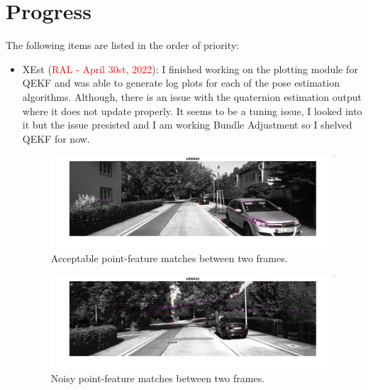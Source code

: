 \documentclass[11pt]{article}
\begin{document}
\section{Progress}
The following items are listed in the order of priority:
\begin{itemize}
    \item XEst (\textcolor{red}{RAL - April 30st, 2022}): I finished working on
    the plotting module for QEKF and was able to generate log plots for each of
    the pose estimation algorithms. Although, there is an issue with the
    quaternion estimation output where it does not update properly. It seems to
    be a tuning issue, I looked into it but the issue presisted and I am working
    Bundle Adjustment so I shelved QEKF for now.



    \begin{figure}[H]
      \begin{center}
        \includegraphics[width=\linewidth]{fig_mat-feat_kf00004.png}
      \end{center}
      \caption{Acceptable point-feature matches between two frames.}
    \end{figure}



    \begin{figure}[H]
      \begin{center}
        \includegraphics[width=\linewidth]{fig_mat-feat_kf00022.png}
      \end{center}
      \caption{Noisy point-feature matches between two frames.}
    \end{figure}


\end{itemize}
\end{document}
